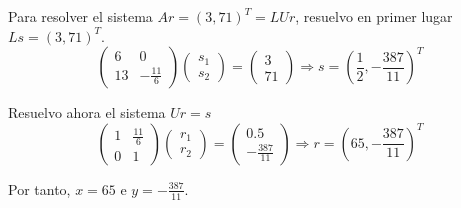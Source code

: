 \begin{ejercicio}
\begin{enumerate}
        Para resolver el sistema $Ar=(3,71)^T = LUr$, resuelvo en primer lugar $Ls=(3,71)^T$.
        \begin{equation*}
            \left(\begin{array}{cc}
            6 & 0\\
            13 & -\frac{11}{6}
            \end{array}\right)
            \left(\begin{array}{c}
            s_1 \\ s_2
            \end{array}\right) =
            \left(\begin{array}{c}
            3 \\ 71
            \end{array}\right) \Longrightarrow
            s = \left(\frac{1}{2},-\frac{387}{11}\right)^T
        \end{equation*}

        Resuelvo ahora el sistema $Ur=s$
        \begin{equation*}
            \left(\begin{array}{cc}
            1 & \frac{11}{6}\\
            0 & 1
            \end{array}\right)
            \left(\begin{array}{c}
            r_1 \\ r_2
            \end{array}\right) =
            \left(\begin{array}{c}
            0.5 \\ -\frac{387}{11}
            \end{array}\right) \Longrightarrow
            r = \left(65 ,-\frac{387}{11} \right)^T
        \end{equation*}

        Por tanto, $x=65$ e $y=-\frac{387}{11}$.
        
    \end{enumerate}
\end{ejercicio}

